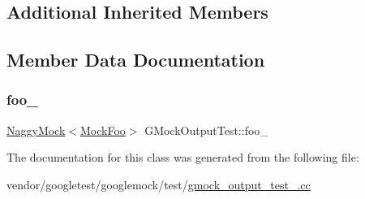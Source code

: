 \subsection*{Additional Inherited Members}


\subsection{Member Data Documentation}
\mbox{\label{class_g_mock_output_test_aed97d2ca515d69466968c60575cc18a2}} 
\subsubsection{\texorpdfstring{foo\+\_\+}{foo\_}}
{\footnotesize\ttfamily \hyperlink{classtesting_1_1_naggy_mock}{Naggy\+Mock}$<$\hyperlink{class_mock_foo}{Mock\+Foo}$>$ G\+Mock\+Output\+Test\+::foo\+\_\+\hspace{0.3cm}{\ttfamily [protected]}}



The documentation for this class was generated from the following file\+:\begin{DoxyCompactItemize}
\item 
vendor/googletest/googlemock/test/\hyperlink{gmock__output__test___8cc}{gmock\+\_\+output\+\_\+test\+\_\+.\+cc}\end{DoxyCompactItemize}
